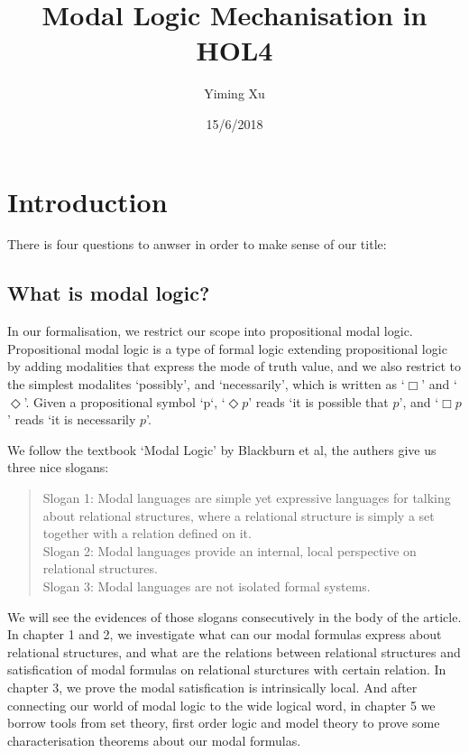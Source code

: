 \documentclass[letterpaper]{article}
\title{Modal Logic Mechanisation in HOL4}
\author{Yiming Xu}
\date{15/6/2018}
\begin{document}
\maketitle

\section{Introduction}

There is four questions to anwser in order to make sense of our title:

\subsection{What is modal logic?}

In our formalisation, we restrict our scope into propositional modal logic. Propositional modal logic is a type of formal logic extending propositional logic by adding modalities that express the mode of truth value, and we also restrict to the simplest modalites `possibly', and `necessarily', which is written as `$\Box$' and `$\Diamond$'. Given a propositional symbol `p`, `$\Diamond p$' reads `it is possible that $p$', and `$\Box p$' reads `it is necessarily $p$'.

We follow the textbook `Modal Logic' by Blackburn et al, the authers give us three nice slogans:

\begin{quotation}
  Slogan 1: Modal languages are simple yet expressive languages for talking about relational structures, where a relational structure is simply a set together with a relation defined on it.\\
  Slogan 2: Modal languages provide an internal, local perspective on relational structures.\\
  Slogan 3: Modal languages are not isolated formal systems.

\end{quotation}
We will see the evidences of those slogans consecutively in the body of the article. In chapter 1 and 2, we investigate what can our modal formulas express about relational structures, and what are the relations between relational structures and satisfication of modal formulas on relational sturctures with certain relation. In chapter 3, we prove the modal satisfication is intrinsically local. And after connecting our world of modal logic to the wide logical word, in chapter 5 we borrow tools from set theory, first order logic and model theory to prove some characterisation theorems about our modal formulas. 
\end{document}
